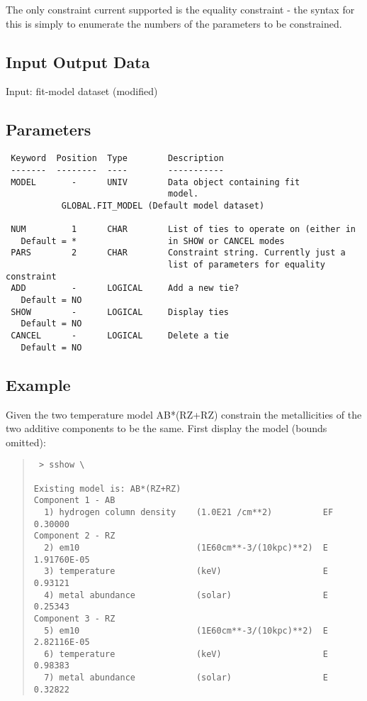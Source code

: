 \documentclass{book}
\renewcommand{\_}{{\tt\char'137}}     %
\begin{document}
The only constraint current supported is the equality constraint - the
syntax for this is simply to enumerate the numbers of the parameters
to be constrained.

\subsection{Input Output Data}
Input: fit-model dataset (modified)
\subsection{Parameters}
\begin{verbatim}
 Keyword  Position  Type        Description
 -------  --------  ----        -----------
 MODEL       -      UNIV        Data object containing fit
                                model.
           GLOBAL.FIT_MODEL (Default model dataset)

 NUM         1      CHAR        List of ties to operate on (either in
   Default = *                  in SHOW or CANCEL modes
 PARS        2      CHAR        Constraint string. Currently just a
                                list of parameters for equality constraint
 ADD         -      LOGICAL     Add a new tie?
   Default = NO
 SHOW        -      LOGICAL     Display ties
   Default = NO
 CANCEL      -      LOGICAL     Delete a tie
   Default = NO

\end{verbatim}\subsection{Example}
Given the two temperature model AB*(RZ+RZ) constrain the metallicities
of the two additive components to be the same. First display the model
(bounds omitted):
\begin{quote}\begin{verbatim}
 > sshow \

Existing model is: AB*(RZ+RZ)
Component 1 - AB
  1) hydrogen column density    (1.0E21 /cm**2)          EF  0.30000
Component 2 - RZ
  2) em10                       (1E60cm**-3/(10kpc)**2)  E   1.91760E-05
  3) temperature                (keV)                    E   0.93121
  4) metal abundance            (solar)                  E   0.25343
Component 3 - RZ
  5) em10                       (1E60cm**-3/(10kpc)**2)  E   2.82116E-05
  6) temperature                (keV)                    E   0.98383
  7) metal abundance            (solar)                  E   0.32822
\end{verbatim}\end{quote}
\end{document}
